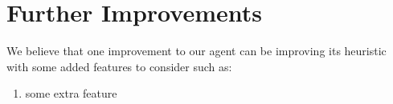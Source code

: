 \documentclass[12pt,a4paper]{article}
\begin{document}
\section{Further Improvements}
We believe that one improvement to our agent can be improving its heuristic with some added features to consider 
such as: 
\begin{enumerate}
    \item some extra feature
\end{enumerate}












\end{document}
